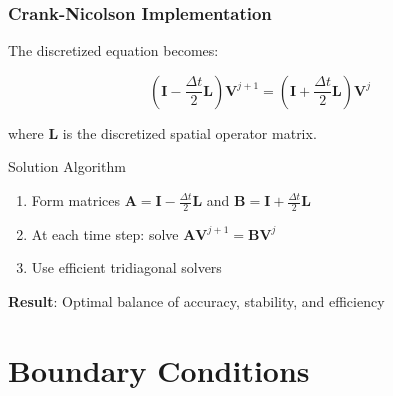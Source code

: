 \documentclass{beamer}
\begin{document}
\begin{frame}
\frametitle{Crank-Nicolson Implementation}
The discretized equation becomes:

$$\left( \mathbf{I} - \frac{\Delta t}{2}\mathbf{L} \right) \mathbf{V}^{j+1} = \left( \mathbf{I} + \frac{\Delta t}{2}\mathbf{L} \right) \mathbf{V}^j$$

where $\mathbf{L}$ is the discretized spatial operator matrix.

\begin{block}{Solution Algorithm}
\begin{enumerate}
\item Form matrices $\mathbf{A} = \mathbf{I} - \frac{\Delta t}{2}\mathbf{L}$ and $\mathbf{B} = \mathbf{I} + \frac{\Delta t}{2}\mathbf{L}$
\item At each time step: solve $\mathbf{A} \mathbf{V}^{j+1} = \mathbf{B} \mathbf{V}^j$
\item Use efficient tridiagonal solvers
\end{enumerate}
\end{block}

\textbf{Result}: Optimal balance of accuracy, stability, and efficiency
\end{frame}

\section{Boundary Conditions}
\end{document}
